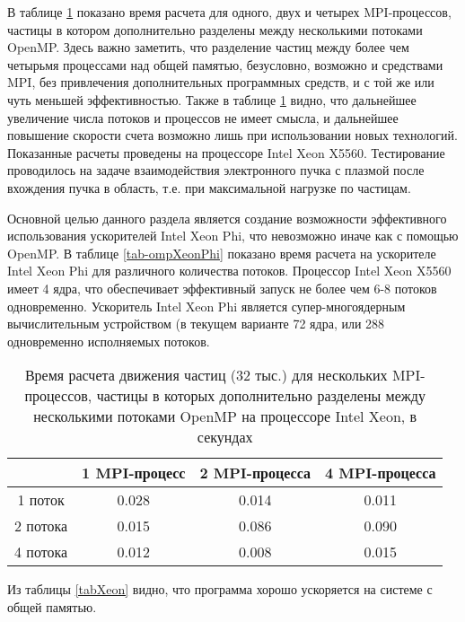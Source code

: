В таблице \ref{tab-ompXeon} показано время расчета для одного, двух и четырех MPI-процессов, частицы в котором дополнительно разделены между несколькими потоками OpenMP. Здесь важно заметить, что разделение частиц между более чем четырьмя процессами над общей памятью, безусловно, возможно и средствами MPI, без привлечения дополнительных программных средств, и с той же или чуть меньшей эффективностью. Также в таблице \ref{tab-ompXeon} видно, что дальнейшее увеличение числа потоков и процессов не имеет смысла, и дальнейшее повышение скорости счета возможно лишь при использовании новых технологий. Показанные расчеты проведены на процессоре Intel Xeon X5560. Тестирование проводилось на задаче взаимодействия электронного пучка с плазмой после вхождения пучка в область, т.е. при максимальной нагрузке по частицам.

Основной целью данного раздела является создание возможности эффективного использования ускорителей Intel Xeon Phi, что невозможно иначе как с помощью OpenMP. В таблице \ref{tab-ompXeonPhi} показано время расчета на ускорителе Intel Xeon Phi  для различного количества потоков. Процессор Intel Xeon X5560 имеет 4 ядра, что обеспечивает эффективный запуск не более чем 6-8 потоков одновременно. Ускоритель Intel Xeon Phi является супер-многоядерным вычислительным устройством (в текущем варианте 72 ядра, или 288 одновременно исполняемых потоков.

\begin{center}
\begin{table} [htbp]

	\caption{Время расчета движения частиц (32 тыс.) для нескольких MPI-процессов, частицы в которых дополнительно разделены между несколькими потоками OpenMP на процессоре Intel Xeon, в секундах}
	\label{tabXeon}%
	\begin{tabular}{| c | c | c| c|}
		\hline
          &  1 MPI-процесс & 2 MPI-процесса & 4 MPI-процесса \\ \hline
1 поток   & 0.028          & 0.014          & 0.011          \\ \hline
2 потока  & 0.015          & 0.086          & 0.090           \\ \hline
4 потока  & 0.012          & 0.008          & 0.015          \\ \hline
	\end{tabular}
	\label{tab-ompXeon}
\end{table}
\end{center}

Из таблицы \ref{tabXeon} видно, что программа хорошо ускоряется на системе с общей памятью.



